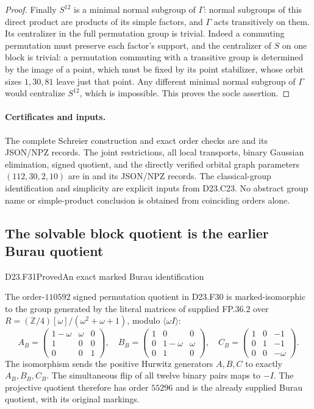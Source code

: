 \begin{proof}
Finally $S^{12}$ is a minimal normal subgroup of $\Gamma$:
normal subgroups of this direct product are products of its
simple factors, and $\Gamma$ acts transitively on them.
Its centralizer in the full permutation group is trivial.
Indeed a commuting permutation must preserve each factor's
support, and the centralizer of $S$ on one block is trivial:
a permutation commuting with a transitive group is determined
by the image of a point, which must be fixed by its point
stabilizer, whose orbit sizes $1,30,81$ leave just that point.
Any different minimal normal subgroup of $\Gamma$ would
centralize $S^{12}$, which is impossible. This proves the
socle assertion.
\end{proof}

\paragraph{Certificates and inputs.}
The complete Schreier construction and exact order checks are
and its JSON/NPZ records. The joint restrictions, all local
transports, binary Gaussian elimination, signed quotient,
and the directly verified orbital graph parameters
$(112,30,2,10)$ are in
and its JSON/NPZ records. The classical-group identification
and simplicity are explicit inputs from D23.C23. No abstract
group name or simple-product conclusion is obtained from
coinciding orders alone.

\subsection{The solvable block quotient is the earlier Burau quotient}

\begin{statement}{D23.F31}{Proved}{An exact marked Burau identification}
\end{statement}
The order-$110592$ signed permutation quotient in D23.F30 is
marked-isomorphic to the group generated by the literal
matrices of supplied FP.36.2 over
$R=(\mathbb Z/4)[\omega]/(\omega^2+\omega+1)$, modulo
$\langle\omega I\rangle$:
\[
 A_B=\begin{pmatrix}1-\omega&\omega&0\\1&0&0\\0&0&1\end{pmatrix},
 \quad B_B=\begin{pmatrix}1&0&0\\0&1-\omega&\omega\\0&1&0\end{pmatrix},
 \quad C_B=\begin{pmatrix}1&0&-1\\0&1&-1\\0&0&-\omega\end{pmatrix}.
\]
The isomorphism sends the positive Hurwitz generators
$A,B,C$ to exactly $A_B,B_B,C_B$. The simultaneous flip of
all twelve binary pairs maps to $-I$. The projective quotient
therefore has order $55296$ and is the already supplied
Burau quotient, with its original markings.

